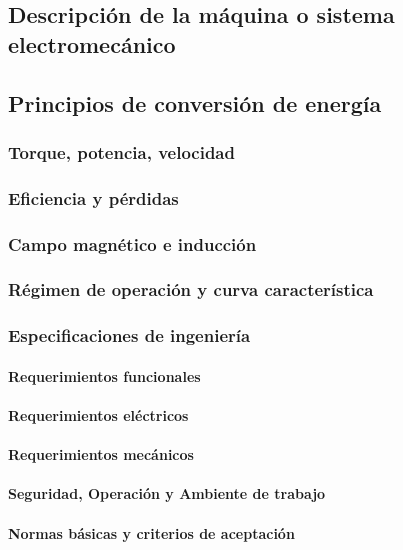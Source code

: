 \subsection{Descripción de la máquina o sistema electromecánico}

\subsection{Principios de conversión de energía}

\subsubsection{Torque, potencia, velocidad}

\subsubsection{Eficiencia y pérdidas}

\subsubsection{Campo magnético e inducción}

\subsubsection{Régimen de operación y curva característica}

\subsubsection{Especificaciones de ingeniería}

\paragraph{Requerimientos funcionales}

\paragraph{Requerimientos eléctricos}

\paragraph{Requerimientos mecánicos}

\paragraph{Seguridad, Operación y Ambiente de trabajo}

\paragraph{Normas básicas y criterios de aceptación}